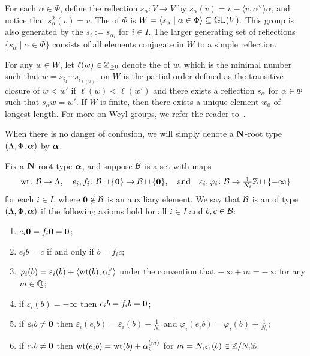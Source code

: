 \documentclass[11pt]{article}
\begin{document}
For each $\alpha \in \Phi$, define the reflection $s_{\alpha} \colon V \to V$ by $s_{\alpha}(v) = v - \langle v,\alpha^{\vee} \rangle \alpha$, and notice that $s_{\alpha}^2(v) = v$.
The  of $\Phi$ is $W = \langle s_\alpha \mid \alpha \in \Phi \rangle \subseteq \mathrm{GL}(V).$
This group is also generated by the  $s_i := s_{\alpha_i} $ for $i \in I$.
The larger generating set of reflections $\{  s_\alpha \mid \alpha \in \Phi\}$ consists of all elements conjugate in $W$ to a simple reflection. 

For any $w \in W$, let $\ell(w) \in \mathbb{Z}_{\geq 0}$ denote the  of $w$, which is the minimal number such that $w = s_{i_1} \cdots s_{i_{\ell(w)}}$.
 on $W$ is the partial order defined as the transitive closure of $w < w'$ if $\ell(w) < \ell(w')$ and there exists a reflection 
$s_\alpha$ for $\alpha \in \Phi$ such that $s_\alpha w = w'$.
If $W$ is finite, then there exists a unique element $w_0$ of longest length.
For more on Weyl groups, we refer the reader to~\cite{Humphreys90}.

When there is no danger of confusion, we will simply denote a $\mathbf{N}$-root type $(\Lambda, \Phi, \boldsymbol{\alpha})$ by $\boldsymbol{\alpha}$.



\begin{definition} 
\label{abstract-def}
Fix a  $\mathbf{N}$-root type $\boldsymbol{\alpha}$, and suppose $\mathcal{B}$ is a set with maps
\[
\operatorname{wt} \colon  \mathcal{B}\to \Lambda,
\quad
e_i,f_i \colon  \mathcal{B} \sqcup\{\boldsymbol{0}\}\to \mathcal{B} \sqcup \{\boldsymbol{0}\},
\quad\text{and}\quad
\varepsilon_i, \varphi_i \colon \mathcal{B} \to \tfrac{1}{N_i}\mathbb{Z} \sqcup \{-\infty\}
\]
for each $i \in I$, where $\boldsymbol{0} \notin \mathcal{B}$ is an auxiliary element.
We say that $\mathcal{B}$ is an 
of type $(\Lambda, \Phi, \boldsymbol{\alpha})$
if the following axioms hold
for all $i \in I$ and $b,c \in \mathcal{B}$:
\begin{enumerate}
\item[(A0)] $e_i\boldsymbol{0} = f_i\boldsymbol{0} = \boldsymbol{0}$;
\item[(A1)] $e_i b = c$ if and only if $b = f_i c$;
\item[(A2)] $\varphi_i(b) = \varepsilon_i(b) + \langle \operatorname{wt}(b), \alpha_i^{\vee} \rangle$
under the convention that $-\infty + m = -\infty$ for any $m \in \mathbb{Q}$;
   \label{axiom:phi_ep_wt}
\item[(A3)] if $\varepsilon_i(b) = -\infty$ then $e_i b = f_i b = \boldsymbol{0}$;
\item[(A4)] if $e_i b \neq \boldsymbol{0}$ then $\varepsilon_i(e_i b) = \varepsilon_i(b) - \frac{1}{N_i}$ and $\varphi_i(e_i b) = \varphi_i(b) + \frac{1}{N_i}$;
\item[(A5)] if $e_i b \neq \boldsymbol{0}$ then $\operatorname{wt}(e_i b) = \operatorname{wt}(b) + \alpha_i^{(m)}$ for $m = N_i \varepsilon_i(b) \in \mathbb{Z}/N_i\mathbb{Z}$.
\end{enumerate}
\end{definition}
\end{document}
